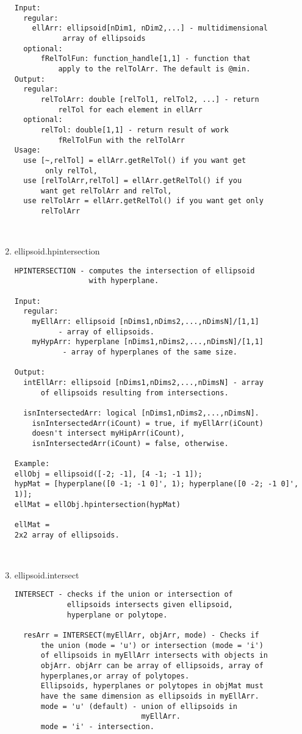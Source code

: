 \begin{enumerate}
\begin{lstlisting}
Input:
  regular:
    ellArr: ellipsoid[nDim1, nDim2,...] - multidimensional
           array of ellipsoids
  optional:
      fRelTolFun: function_handle[1,1] - function that
          apply to the relTolArr. The default is @min.
Output:
  regular:
      relTolArr: double [relTol1, relTol2, ...] - return
          relTol for each element in ellArr
  optional:
      relTol: double[1,1] - return result of work
          fRelTolFun with the relTolArr
Usage:
  use [~,relTol] = ellArr.getRelTol() if you want get
       only relTol,
  use [relTolArr,relTol] = ellArr.getRelTol() if you
      want get relTolArr and relTol,
  use relTolArr = ellArr.getRelTol() if you want get only
      relTolArr



\end{lstlisting}
\fontfamily{\familydefault}
\selectfont
\item {ellipsoid.hpintersection}
\selectfont
\begin{lstlisting}
HPINTERSECTION - computes the intersection of ellipsoid
                 with hyperplane.

Input:
  regular:
    myEllArr: ellipsoid [nDims1,nDims2,...,nDimsN]/[1,1]
          - array of ellipsoids.
    myHypArr: hyperplane [nDims1,nDims2,...,nDimsN]/[1,1]
           - array of hyperplanes of the same size.

Output:
  intEllArr: ellipsoid [nDims1,nDims2,...,nDimsN] - array
      of ellipsoids resulting from intersections.

  isnIntersectedArr: logical [nDims1,nDims2,...,nDimsN].
    isnIntersectedArr(iCount) = true, if myEllArr(iCount)
    doesn't intersect myHipArr(iCount),
    isnIntersectedArr(iCount) = false, otherwise.

Example:
ellObj = ellipsoid([-2; -1], [4 -1; -1 1]);
hypMat = [hyperplane([0 -1; -1 0]', 1); hyperplane([0 -2; -1 0]', 1)];
ellMat = ellObj.hpintersection(hypMat)

ellMat =
2x2 array of ellipsoids.



\end{lstlisting}
\fontfamily{\familydefault}
\selectfont
\item {ellipsoid.intersect}
\selectfont
\begin{lstlisting}
INTERSECT - checks if the union or intersection of
            ellipsoids intersects given ellipsoid,
            hyperplane or polytope.

  resArr = INTERSECT(myEllArr, objArr, mode) - Checks if
      the union (mode = 'u') or intersection (mode = 'i')
      of ellipsoids in myEllArr intersects with objects in
      objArr. objArr can be array of ellipsoids, array of
      hyperplanes,or array of polytopes.
      Ellipsoids, hyperplanes or polytopes in objMat must
      have the same dimension as ellipsoids in myEllArr.
      mode = 'u' (default) - union of ellipsoids in
                             myEllArr.
      mode = 'i' - intersection.


\end{lstlisting}
\end{enumerate}
